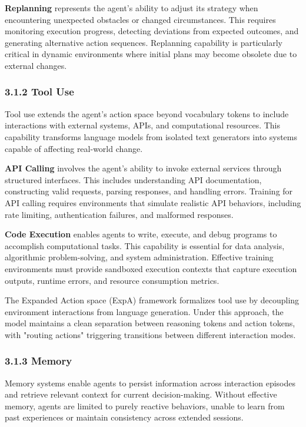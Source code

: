 \textbf{Replanning} represents the agent's ability to adjust its strategy when encountering unexpected obstacles or changed circumstances. This requires monitoring execution progress, detecting deviations from expected outcomes, and generating alternative action sequences. Replanning capability is particularly critical in dynamic environments where initial plans may become obsolete due to external changes.

\subsubsection{3.1.2 Tool Use}

Tool use extends the agent's action space beyond vocabulary tokens to include interactions with external systems, APIs, and computational resources. This capability transforms language models from isolated text generators into systems capable of affecting real-world change.

\textbf{API Calling} involves the agent's ability to invoke external services through structured interfaces. This includes understanding API documentation, constructing valid requests, parsing responses, and handling errors. Training for API calling requires environments that simulate realistic API behaviors, including rate limiting, authentication failures, and malformed responses.

\textbf{Code Execution} enables agents to write, execute, and debug programs to accomplish computational tasks. This capability is essential for data analysis, algorithmic problem-solving, and system administration. Effective training environments must provide sandboxed execution contexts that capture execution outputs, runtime errors, and resource consumption metrics.

The Expanded Action space (ExpA) framework formalizes tool use by decoupling environment interactions from language generation. Under this approach, the model maintains a clean separation between reasoning tokens and action tokens, with "routing actions" triggering transitions between different interaction modes.

\subsubsection{3.1.3 Memory}

Memory systems enable agents to persist information across interaction episodes and retrieve relevant context for current decision-making. Without effective memory, agents are limited to purely reactive behaviors, unable to learn from past experiences or maintain consistency across extended sessions.

